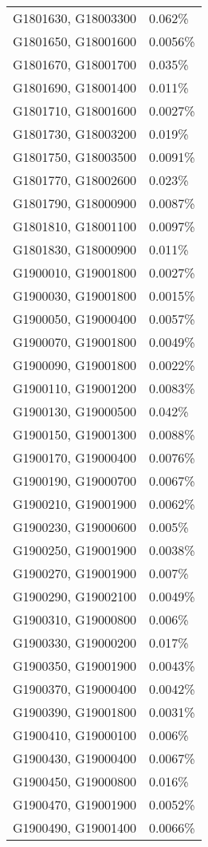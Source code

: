 \begin{longtable}[]{@{}ll@{}}
G1801630, G18003300 & 0.062\% \\
G1801650, G18001600 & 0.0056\% \\
G1801670, G18001700 & 0.035\% \\
G1801690, G18001400 & 0.011\% \\
G1801710, G18001600 & 0.0027\% \\
G1801730, G18003200 & 0.019\% \\
G1801750, G18003500 & 0.0091\% \\
G1801770, G18002600 & 0.023\% \\
G1801790, G18000900 & 0.0087\% \\
G1801810, G18001100 & 0.0097\% \\
G1801830, G18000900 & 0.011\% \\
G1900010, G19001800 & 0.0027\% \\
G1900030, G19001800 & 0.0015\% \\
G1900050, G19000400 & 0.0057\% \\
G1900070, G19001800 & 0.0049\% \\
G1900090, G19001800 & 0.0022\% \\
G1900110, G19001200 & 0.0083\% \\
G1900130, G19000500 & 0.042\% \\
G1900150, G19001300 & 0.0088\% \\
G1900170, G19000400 & 0.0076\% \\
G1900190, G19000700 & 0.0067\% \\
G1900210, G19001900 & 0.0062\% \\
G1900230, G19000600 & 0.005\% \\
G1900250, G19001900 & 0.0038\% \\
G1900270, G19001900 & 0.007\% \\
G1900290, G19002100 & 0.0049\% \\
G1900310, G19000800 & 0.006\% \\
G1900330, G19000200 & 0.017\% \\
G1900350, G19001900 & 0.0043\% \\
G1900370, G19000400 & 0.0042\% \\
G1900390, G19001800 & 0.0031\% \\
G1900410, G19000100 & 0.006\% \\
G1900430, G19000400 & 0.0067\% \\
G1900450, G19000800 & 0.016\% \\
G1900470, G19001900 & 0.0052\% \\
G1900490, G19001400 & 0.0066\% \\

\end{longtable}
